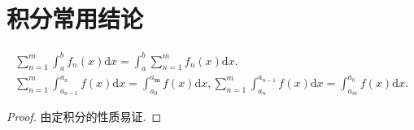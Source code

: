 \documentclass[../../main.tex]{subfiles}
\begin{document}
\section{积分常用结论}

\begin{theorem}[基本结论]\label{theorem:积分与求和基本结论}
\begin{gather*}
\sum\limits_{n=1}^m{\int_a^b{f_n\left( x \right) \mathrm{d}x=}}\int_a^b{\sum\limits_{n=1}^m{f_n\left( x \right) \mathrm{d}x}}.
\\
\sum\limits_{n=1}^m{\int_{a_{n-1}}^{a_n}{f\left( x \right) \mathrm{d}x=}}\int_{a_0}^{a_{\boldsymbol{m}}}{f\left( x \right) \mathrm{d}x},\sum\limits_{n=1}^m{\int_{a_n}^{a_{n-1}}{f\left( x \right) \mathrm{d}x}}=\int_{a_m}^{a_0}{f\left( x \right) \mathrm{d}x}.
\end{gather*}
\end{theorem}
\begin{proof}
由定积分的性质易证.
\end{proof}
\end{document}
